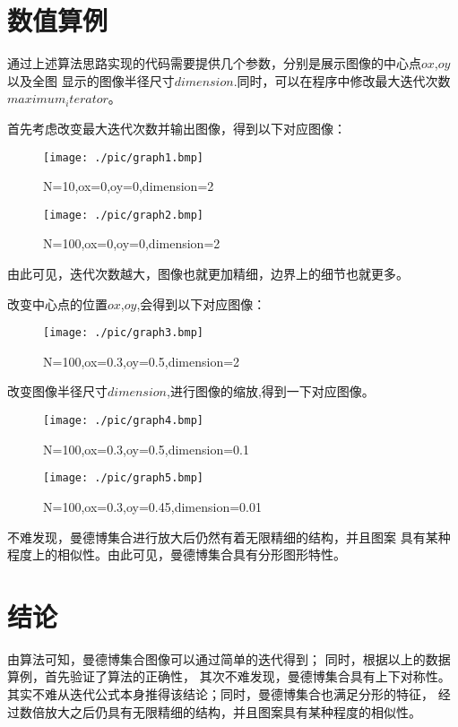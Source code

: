 \section{数值算例}
通过上述算法思路实现的代码需要提供几个参数，分别是展示图像的中心点$ox$,$oy$以及全图
显示的图像半径尺寸$dimension$.同时，可以在程序中修改最大迭代次数$maximum_iterator$。
\par 
首先考虑改变最大迭代次数并输出图像，得到以下对应图像：
\begin{figure}[H]
    \centering
    \texttt{[image: ./pic/graph1.bmp]}
    \caption{N=10,ox=0,oy=0,dimension=2}
\end{figure}
\par 
\begin{figure}[H]
    \centering
    \texttt{[image: ./pic/graph2.bmp]}
    \caption{N=100,ox=0,oy=0,dimension=2}
\end{figure}
由此可见，迭代次数越大，图像也就更加精细，边界上的细节也就更多。
\par 
改变中心点的位置$ox$,$oy$,会得到以下对应图像：
\begin{figure}[H]
    \centering
    \texttt{[image: ./pic/graph3.bmp]}
    \caption{N=100,ox=0.3,oy=0.5,dimension=2}
\end{figure}
\par 
改变图像半径尺寸$dimension$,进行图像的缩放,得到一下对应图像。
\begin{figure}[H]
    \centering
    \texttt{[image: ./pic/graph4.bmp]}
    \caption{N=100,ox=0.3,oy=0.5,dimension=0.1}
\end{figure}
\par 
\begin{figure}[H]
    \centering
    \texttt{[image: ./pic/graph5.bmp]}
    \caption{N=100,ox=0.3,oy=0.45,dimension=0.01}
\end{figure}
不难发现，曼德博集合进行放大后仍然有着无限精细的结构，并且图案
具有某种程度上的相似性。由此可见，曼德博集合具有分形图形特性。

\section{结论}
由算法可知，曼德博集合图像可以通过简单的迭代得到；
同时，根据以上的数据算例，首先验证了算法的正确性，
其次不难发现，曼德博集合具有上下对称性。
其实不难从迭代公式本身推得该结论；同时，曼德博集合也满足分形的特征，
经过数倍放大之后仍具有无限精细的结构，并且图案具有某种程度的相似性。